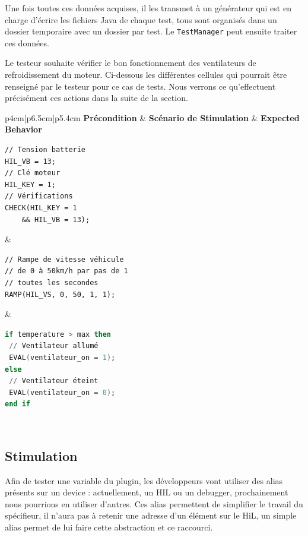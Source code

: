 Une fois toutes ces données acquises, il les transmet à un générateur qui est en charge d'écrire les fichiers Java de chaque test, tous sont organisés dans un dossier temporaire avec un dossier par test. Le \texttt{TestManager} peut ensuite traiter ces données.

\begin{exemple}
Le testeur souhaite vérifier le bon fonctionnement des ventilateurs de refroidissement du moteur. Ci-dessous les différentes cellules qui pourrait être renseigné par le testeur pour ce cas de tests. Nous verrons ce qu'effectuent précisément ces actions dans la suite de la section.	

\begin{tabular}{p{4cm}|p{6.5cm}|p{5.4cm}}
	\textbf{Précondition} & \textbf{Scénario de Stimulation} & \textbf{Expected Behavior}\\
	\hline
	\begin{minipage}{0.1\linewidth}
		\begin{lstlisting}[framerule=0pt,language=gtl]
// Tension batterie
HIL_VB = 13;
// Clé moteur
HIL_KEY = 1;
// Vérifications
CHECK(HIL_KEY = 1 
	&& HIL_VB = 13);
	\end{lstlisting}
	\end{minipage} & 
	\begin{minipage}{0.1\linewidth}
		\begin{lstlisting}[framerule=0pt,language=gtl]
// Rampe de vitesse véhicule
// de 0 à 50km/h par pas de 1 
// toutes les secondes	
RAMP(HIL_VS, 0, 50, 1, 1);
		\end{lstlisting}
	\end{minipage} 
	&
		\begin{minipage}{0.1\linewidth}
			\begin{lstlisting}[language=ada,framerule=0pt,language=gtl]	
if temperature > max then
 // Ventilateur allumé
 EVAL(ventilateur_on = 1); 
else
 // Ventilateur éteint
 EVAL(ventilateur_on = 0); 
end if
			\end{lstlisting}
		\end{minipage} 
	\\
\end{tabular}
\end{exemple}

\subsection{Stimulation} \label{stim}
\vspace{-20px}
Afin de tester une variable du plugin, les développeurs vont utiliser des alias présents sur un device : actuellement, un HIL ou un debugger, prochainement nous pourrions en utiliser d'autres. Ces alias permettent de simplifier le travail du spécifieur, il n'aura pas à retenir une adresse d'un élément sur le HiL, un simple alias permet de lui faire cette abstraction et ce raccourci.

